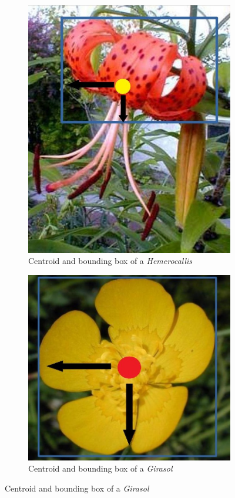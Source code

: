 \documentclass[11]{article}
\begin{document}
\begin{figure}[H]
    \begin{subfigure}[t]{0.45\textwidth}
    \centering
  \includegraphics[scale=0.2]{images/hemerocallisCentroid.jpg}
    \caption{Centroid and bounding box of a \textit{Hemerocallis}}
    \label{centroidHemerocallis}
    \end{subfigure}
    \begin{subfigure}[t]{0.45\textwidth}
    \centering
    \includegraphics[scale=0.2]{images/GirasolCentroid.jpg}
    \caption{Centroid and bounding box of a \textit{Girasol}}
    \label{centroidgirasol}
    \end{subfigure}
\end{figure}
\end{document}
